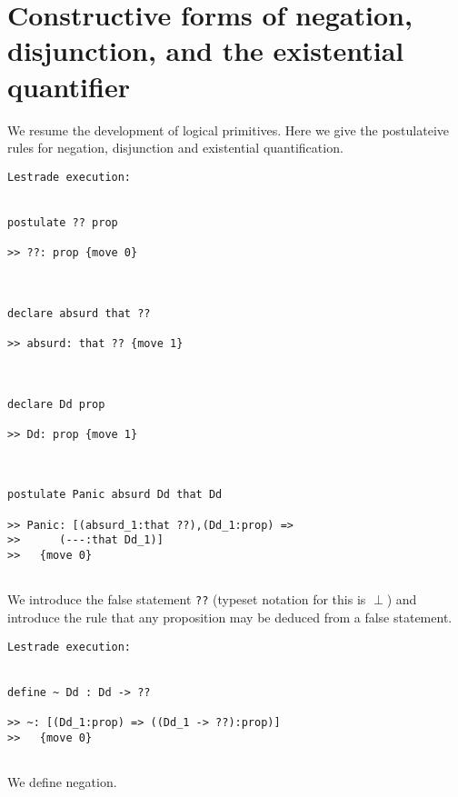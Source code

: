 \documentclass[12pt]{article}
\begin{document}
\section{Constructive forms of negation, disjunction, and the existential quantifier}

We resume the development of logical primitives.  Here we give the postulateive rules for negation, disjunction and existential quantification.

\begin{verbatim}Lestrade execution:


postulate ?? prop

>> ??: prop {move 0}



declare absurd that ??

>> absurd: that ?? {move 1}



declare Dd prop

>> Dd: prop {move 1}



postulate Panic absurd Dd that Dd

>> Panic: [(absurd_1:that ??),(Dd_1:prop) =>
>>      (---:that Dd_1)]
>>   {move 0}


\end{verbatim}

We introduce the false statement {\tt ??} (typeset notation for this is $\perp$) and introduce the rule that any proposition may be deduced from a false statement.

\begin{verbatim}Lestrade execution:


define ~ Dd : Dd -> ??

>> ~: [(Dd_1:prop) => ((Dd_1 -> ??):prop)]
>>   {move 0}


\end{verbatim}

We define negation.
\end{document}
